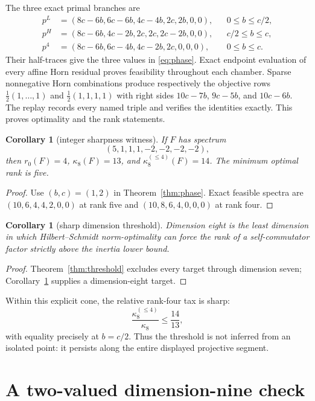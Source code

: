 \documentclass[11pt]{article}
\newtheorem{corollary}[theorem]{Corollary}
\begin{document}
The three exact primal branches are
\begin{align}
 p^L&=(8c-6b,6c-6b,4c-4b,2c,2b,0,0),&&0\le b\le c/2,\label{eq:pL}\\
 p^H&=(8c-6b,4c-2b,2c,2c,2c-2b,0,0),&&c/2\le b\le c,\label{eq:pH}\\
 p^4&=(8c-6b,6c-4b,4c-2b,2c,0,0,0),&&0\le b\le c.\label{eq:p4}
\end{align}
Their half-traces give the three values in \eqref{eq:phase}.  Exact endpoint
evaluation of every affine Horn residual proves feasibility throughout each
chamber.  Sparse nonnegative Horn combinations produce respectively the
objective rows $\frac12(1,\ldots,1)$ and
$\frac12(1,1,1,1)$ with right sides $10c-7b$, $9c-5b$, and $10c-6b$.
The replay records every named triple and verifies the identities exactly.
This proves optimality and the rank statements.

\begin{corollary}[integer sharpness witness]\label{cor:witness}
If $F$ has spectrum
\[
 (5,1,1,1,-2,-2,-2,-2),
\]
then $r_0(F)=4$, $\kappa_8(F)=13$, and
$\kappa_8^{(\le4)}(F)=14$.  The minimum optimal rank is five.
\end{corollary}

\begin{proof}
Use $(b,c)=(1,2)$ in Theorem~\ref{thm:phase}.  Exact feasible spectra are
$(10,6,4,4,2,0,0)$ at rank five and $(10,8,6,4,0,0,0)$ at rank four.
\end{proof}

\begin{corollary}[sharp dimension threshold]
Dimension eight is the least dimension in which Hilbert--Schmidt
norm-optimality can force the rank of a self-commutator factor strictly above
the inertia lower bound.
\end{corollary}

\begin{proof}
Theorem~\ref{thm:threshold} excludes every target through dimension seven;
Corollary~\ref{cor:witness} supplies a dimension-eight target.
\end{proof}

Within this explicit cone, the relative rank-four tax is sharp:
\[
 \frac{\kappa_8^{(\le4)}}{\kappa_8}\le\frac{14}{13},
\]
with equality precisely at $b=c/2$.  Thus the threshold is not inferred from
an isolated point: it persists along the entire displayed projective segment.

\section{A two-valued dimension-nine check}
\end{document}
